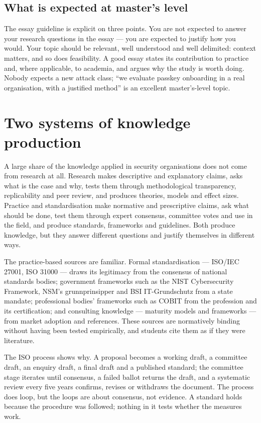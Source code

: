 \documentclass[11pt,a4paper,british,twoside=false,headings=small,chapterprefix=false,numbers=noenddot]{scrbook}
\begin{document}
\subsection{What is expected at master's level}

The essay guideline is explicit on three points. You are not expected to answer your research questions in the essay --- you are expected to justify how you would. Your topic should be relevant, well understood and well delimited: context matters, and so does feasibility. A good essay states its contribution to practice and, where applicable, to academia, and argues why the study is worth doing. Nobody expects a new attack class; ``we evaluate passkey onboarding in a real organisation, with a justified method'' is an excellent master's-level topic.

\section{Two systems of knowledge production}

A large share of the knowledge applied in security organisations does not come from research at all. Research makes descriptive and explanatory claims, asks what is the case and why, tests them through methodological transparency, replicability and peer review, and produces theories, models and effect sizes. Practice and standardisation make normative and prescriptive claims, ask what should be done, test them through expert consensus, committee votes and use in the field, and produce standards, frameworks and guidelines. Both produce knowledge, but they answer different questions and justify themselves in different ways.

The practice-based sources are familiar. Formal standardisation --- ISO/IEC 27001, ISO 31000 --- draws its legitimacy from the consensus of national standards bodies; government frameworks such as the NIST Cybersecurity Framework, NSM's grunnprinsipper and BSI IT-Grundschutz from a state mandate; professional bodies' frameworks such as COBIT from the profession and its certification; and consulting knowledge --- maturity models and frameworks --- from market adoption and references. These sources are normatively binding without having been tested empirically, and students cite them as if they were literature.

The ISO process shows why. A proposal becomes a working draft, a committee draft, an enquiry draft, a final draft and a published standard; the committee stage iterates until consensus, a failed ballot returns the draft, and a systematic review every five years confirms, revises or withdraws the document. The process does loop, but the loops are about consensus, not evidence. A standard holds because the procedure was followed; nothing in it tests whether the measures work.
\end{document}
